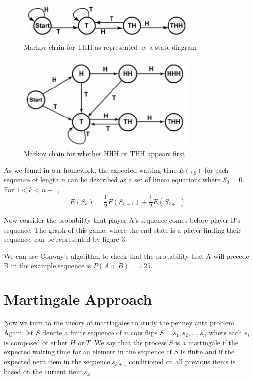 \documentclass{article}
\numberwithin{mytheorem}{subsection} %
\begin{document}
		\begin{figure}[h]
			\begin{center}
				\includegraphics[width=3.5in]{StateDiagramforTHH}
			\end{center}
			
			\caption{Markov chain for THH as represented by a state diagram \cite{nickerson}}
			\label{perfect_fig}
		\end{figure}

		\begin{figure}[h]
			\begin{center}
				\includegraphics[width=3.5in]{RaceBetweenHHHandTHH}
			\end{center}
			
			\caption{Markov chain for whether HHH or THH appears first \cite{nickerson}}
			\label{perfect_fig}
		\end{figure}

		As we found in our homework, the expected waiting time $E(\tau_S)$ for each sequence of length $n$ can be described as a set of linear equations where $S_0 = 0$. For $1 < k < n-1$,
		$$E(S_k) = \frac{1}{2}E(S_{k-1}) + \frac{1}{2}E(S_{k+1})$$  

		Now consider the probability that player A's sequence comes before player B's sequence. The graph of this game, where the end state is a player finding their sequence, can be represented by figure 3.

		We can use Conway's algorithm to check that the probability that A will precede B in the example sequence is $P(A < B) = .125$. 
 
	\section{Martingale Approach}
		Now we turn to the theory of martingales to study the penney ante problem. Again, let $S$ denote a finite sequence of $n$ coin flips $S = s_1, s_2, ..., s_n$ where each $s_i$ is composed of either $H$ or $T$. We say that the process $S$ is a martingale if the expected waiting time for an element in the sequence of $S$ is finite and if the expected next item in the sequence $s_{k+1}$ conditioned on all previous items is based on the current item $s_k$. 
\end{document}
